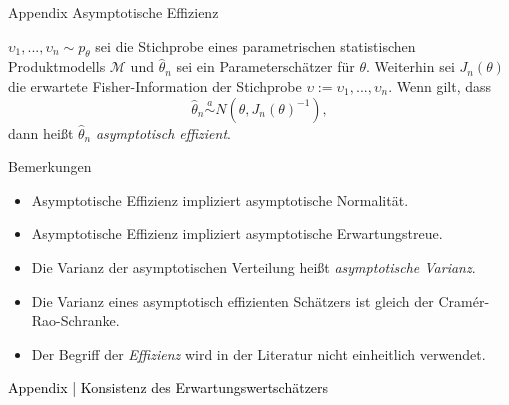 \documentclass[
  8pt,
  ignorenonframetext,
]{beamer}
\providecommand{\tightlist}{%
  \setlength{\itemsep}{0pt}\setlength{\parskip}{0pt}}
\newcommand{\ups} {\upsilon}
\begin{document}
\begin{frame}{\small Appendix \textbar{} Asymptotische Effizienz}
\protect\hypertarget{appendix-asymptotische-effizienz}{}
\small
\begin{definition}
\justifying
$\ups_1,...,\ups_n \sim p_\theta$ sei die Stichprobe eines parametrischen statistischen
Produktmodells $\mathcal{M}$ und $\hat{\theta}_n$ sei ein Parameterschätzer für
$\theta$. Weiterhin sei $J_n(\theta)$ die erwartete Fisher-Information der
Stichprobe $\ups := \ups_1,...,\ups_n$. Wenn gilt, dass
\begin{equation}
\hat{\theta}_n \stackrel{a}{\sim} N\left(\theta, J_n(\theta)^{-1}\right),
\end{equation}
dann heißt $\hat{\theta}_n$ \textit{asymptotisch effizient}.
\end{definition}
\footnotesize

Bemerkungen

\begin{itemize}
\tightlist
\item
  Asymptotische Effizienz impliziert asymptotische Normalität.
\item
  Asymptotische Effizienz impliziert asymptotische Erwartungstreue.
\item
  Die Varianz der asymptotischen Verteilung heißt
  \textit{asymptotische Varianz}.
\item
  Die Varianz eines asymptotisch effizienten Schätzers ist gleich der
  Cramér-Rao-Schranke.
\item
  Der Begriff der \textit{Effizienz} wird in der Literatur nicht
  einheitlich verwendet.
\end{itemize}
\end{frame}

\begin{frame}[plain]{}
\protect\hypertarget{section-17}{}
\vfill
\center
\large

\textcolor{black}{Appendix | Konsistenz des Erwartungswertschätzers}
\vfill
\end{frame}
\end{document}
